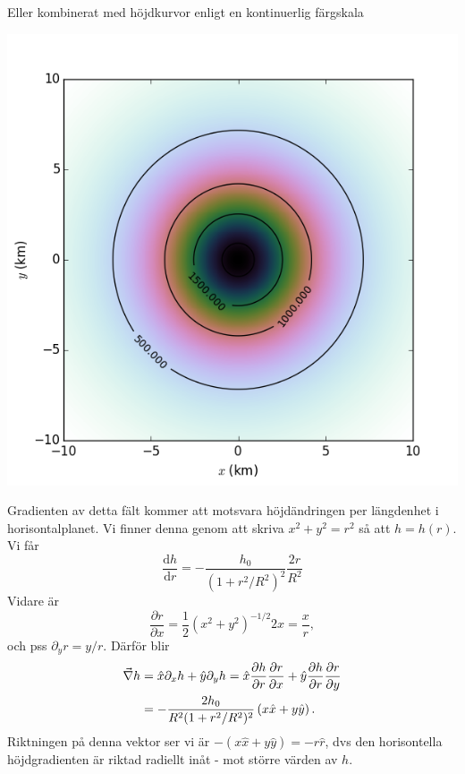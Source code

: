 \documentclass[%
oneside,                 %
final,                   %
10pt]{article}
\newenvironment{notice_mdfboxadmon}[1][]{
\begin{notice_mdfboxmdframed}[frametitle=#1]
}
{
\end{notice_mdfboxmdframed}
}
\begin{document}
\begin{notice_mdfboxadmon}
\vspace{6mm}



Eller kombinerat med höjdkurvor enligt en kontinuerlig färgskala



\vspace{6mm}

\centerline{\includegraphics[width=0.8\linewidth]{fig/hojd_contour_colormesh.png}}

\vspace{6mm}



Gradienten av detta fält kommer att motsvara höjdändringen per längdenhet i horisontalplanet. Vi finner denna genom att skriva $x^2 + y^2 = r^2$ så att $h=h(r)$. Vi får
\begin{equation}
\frac{\mbox{d}h}{\mbox{d}r} = - \frac{h_0}{(1+r^2/R^2)^2} \frac{2r}{R^2}
\end{equation}
Vidare är 
\begin{equation}
\frac{\partial r}{\partial x} = \frac{1}{2} (x^2 + y^2)^{-1/2} 2 x = \frac{x}{r},
\end{equation}
och pss $\partial_y r = y/r$. Därför blir
\begin{align}
\vec{\nabla} h &= \hat{x} \partial_x h + \hat{y} \partial_y h 
= \hat{x} \frac{\partial h}{\partial r} \frac{\partial r}{\partial x}
+ \hat{y} \frac{\partial h}{\partial r} \frac{\partial r}{\partial y} \\ 
&= - \frac{2h_0}{R^2 (1+r^2/R^2)^2} \left( x \hat{x} + y \hat{y} \right).
\end{align}
Riktningen på denna vektor ser vi är $-\left( x\hat{x} + y\hat{y} \right) = -r\hat{r}$, dvs den horisontella höjdgradienten är riktad radiellt inåt - mot större värden av $h$.





\end{notice_mdfboxadmon}
\end{document}
